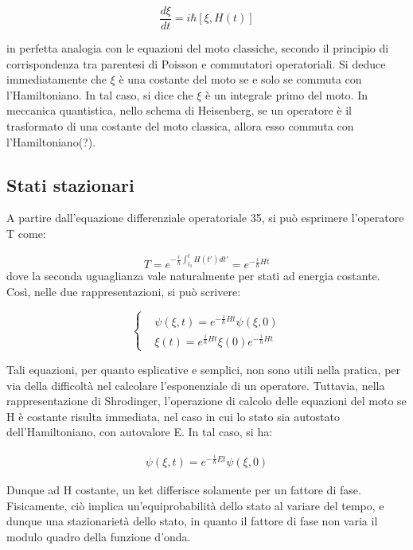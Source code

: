 \documentclass{article}
\begin{document}
\begin{equation}
   \frac{d\xi}{dt}=i\hbar[\xi,H(t)]
\end{equation}

in perfetta analogia con le equazioni del moto classiche, secondo il principio di corrispondenza tra parentesi di Poisson e commutatori operatoriali.
Si deduce immediatamente che $\xi$ è una costante del moto se e solo se commuta con l'Hamiltoniano. In tal caso, si dice che $\xi$ è un integrale primo del moto.
In meccanica quantistica, nello schema di Heisenberg, se un operatore è il trasformato di una costante del moto classica, allora esso commuta con l'Hamiltoniano(?).

\subsection{Stati stazionari}
A partire dall'equazione differenziale operatoriale 35, si può esprimere l'operatore T come:

\begin{equation}
    T=e^{-\frac{i}{\hbar}\int_{t_0}^{t}H(t')dt'}=e^{-\frac{i}{\hbar}Ht}
\end{equation}
dove la seconda uguaglianza vale naturalmente per stati ad energia costante.
Così, nelle due rappresentazioni, si può scrivere:

\begin{equation}
    \left\{
    \begin{aligned}
    & \psi(\xi,t)=e^{-\frac{i}{\hbar}Ht}\psi(\xi,0) \\
    & \xi(t)=e^{\frac{i}{\hbar}Ht}\xi(0)e^{-\frac{i}{\hbar}Ht}
    \end{aligned}
    \right.
\end{equation}

Tali equazioni, per quanto esplicative e semplici, non sono utili nella pratica, per via della difficoltà nel calcolare l'esponenziale di un operatore.
Tuttavia, nella rappresentazione di Shrodinger, l'operazione di calcolo delle equazioni del moto se H è costante risulta immediata, nel caso in cui
lo stato sia autostato dell'Hamiltoniano, con autovalore E. In tal caso, si ha:

\begin{equation}
    \begin{aligned}
    \psi(\xi,t)=e^{-\frac{i}{\hbar}Et}\psi(\xi,0)
    \end{aligned}
\end{equation}

Dunque ad H costante, un ket differisce solamente per un fattore di fase.
Fisicamente, ciò implica un'equiprobabilità dello stato al variare del tempo, e dunque una stazionarietà dello stato, in quanto il fattore di fase non varia il modulo quadro della funzione d'onda.
\end{document}
